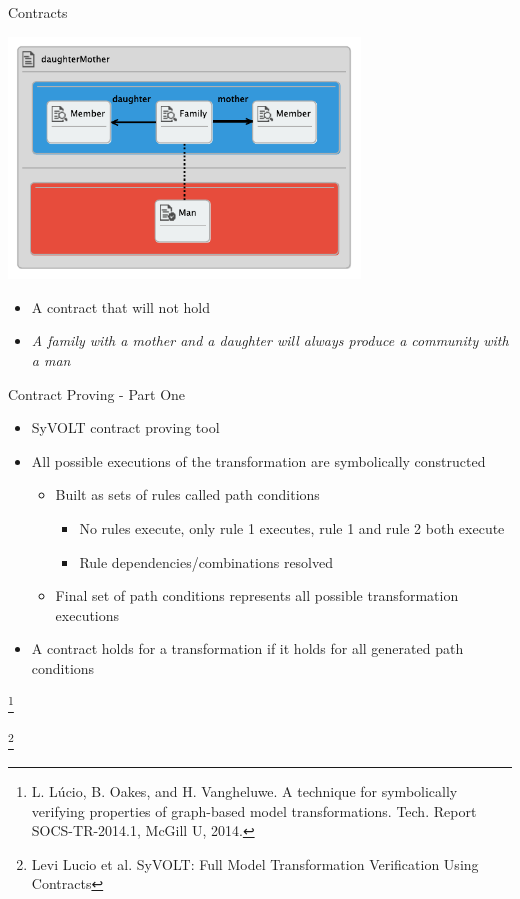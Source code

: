 \documentclass[xcolor=dvipsnames, 12pt]{beamer}
\newcommand\blfootnote[1]{%
  \begingroup
  \renewcommand\thefootnote{}\footnote{#1}%
  \addtocounter{footnote}{-1}%
  \endgroup
}
\begin{document}
\begin{frame}{Contracts}
\begin{center}
\includegraphics[width=0.7\textwidth]{figures/daughterMotherProp}
\end{center}
\begin{itemize}[<+->]
\item A contract that will not hold
\item \textit{A family with a mother and a daughter will always produce a community with a man}
\end{itemize}
\end{frame}



\begin{frame}{Contract Proving - Part One}
\begin{itemize}[<+->]
\item SyVOLT contract proving tool
\item All possible executions of the transformation are symbolically constructed
\begin{itemize}[<+->]
\item Built as sets of rules called path conditions
\begin{itemize}
\item No rules execute, only rule 1 executes, rule 1 and rule 2 both execute
\item Rule dependencies/combinations resolved
\end{itemize}
\item Final set of path conditions represents all possible transformation executions
\end{itemize}
\item A contract holds for a transformation if it holds for all generated path conditions
\end{itemize}
\blfootnote{L. Lúcio, B. Oakes, and H. Vangheluwe. A technique for symbolically verifying properties of graph-based model transformations. Tech. Report SOCS-TR-2014.1, McGill U, 2014.}
\blfootnote{Levi Lucio et al. SyVOLT: Full Model Transformation Verification Using Contracts}
\end{frame}
\end{document}
